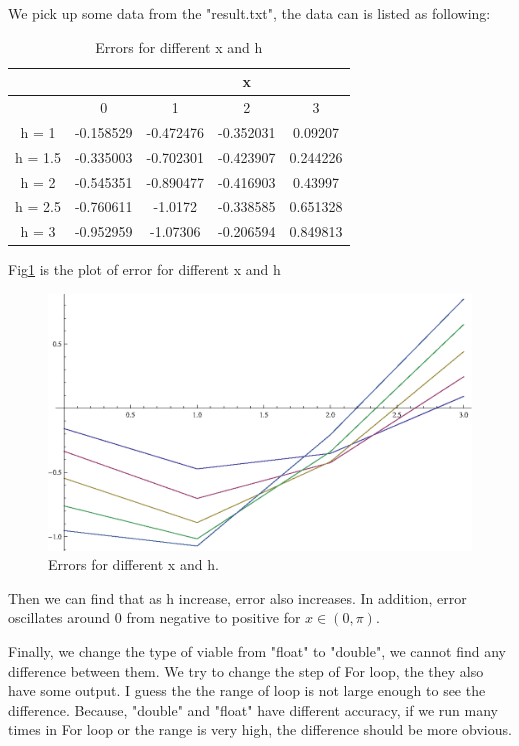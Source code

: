 \documentclass{article}
\begin{document}
We pick up some data from the "result.txt", the data can is listed as following:
\begin{table}[h]
\caption{Errors for different x and h} 
\centering 
\begin{tabular}{c c c c c}
            \hline\hline
                &           &             & x        &\\ \hline
               & 0         & 1         & 2         & 3        \\ \hline
        h = 1   & -0.158529 & -0.472476 & -0.352031 & 0.09207  \\ \hline
        h = 1.5 & -0.335003 & -0.702301 & -0.423907 & 0.244226 \\ \hline
        h = 2   & -0.545351 & -0.890477 & -0.416903 & 0.43997  \\ \hline
        h = 2.5 & -0.760611 & -1.0172   & -0.338585 & 0.651328 \\ \hline
        h = 3   & -0.952959 & -1.07306  & -0.206594 & 0.849813        \\ \hline
\end{tabular}
\end{table}

Fig\ref{fig2} is the plot of error for different x and h
\begin{figure}
    \centering
    \includegraphics[width=5.0in]{Fig2}
    \caption{Errors for different x and h.}
    \label{fig2}
\end{figure}

Then we can find that as h increase, error also increases. In addition, error oscillates around 0 from negative to positive for $x\in(0, \pi)$.

Finally, we change the type of viable from "float" to "double", we cannot find any difference between them. We try to change the step of For loop, the they also have some output. I guess the the range of loop is not large enough to see the difference. Because, "double" and "float" have different accuracy, if we run many times in For loop or the range is very high, the difference should be more obvious.
\end{document}

